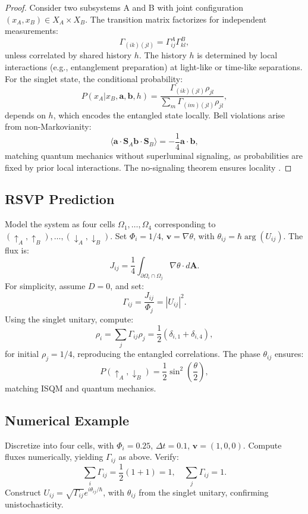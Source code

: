 \documentclass[12pt]{article}
\begin{document}
{\begin{proof}
Consider two subsystems A and B with joint configuration \((x_A, x_B) \in X_A \times X_B\). The transition matrix factorizes for independent measurements:
\[
\Gamma_{(i k)(j l)} = \Gamma_{ij}^A \Gamma_{kl}^B,
\]
unless correlated by shared history \(h\). The history \(h\) is determined by local interactions (e.g., entanglement preparation) at light-like or time-like separations. For the singlet state, the conditional probability:
\[
P(x_A | x_B, \mathbf{a}, \mathbf{b}, h) = \frac{\Gamma_{(i k)(j l)} \rho_{j l}}{\sum_m \Gamma_{(i m)(j l)} \rho_{j l}},
\]
depends on \(h\), which encodes the entangled state locally. Bell violations arise from non-Markovianity:
\[
\langle \mathbf{a} \cdot \mathbf{S}_A \mathbf{b} \cdot \mathbf{S}_B \rangle = -\frac{1}{4} \mathbf{a} \cdot \mathbf{b},
\]
matching quantum mechanics without superluminal signaling, as probabilities are fixed by prior local interactions. The no-signaling theorem ensures locality \cite{Barandes2023}.
\end{proof}

\subsection{RSVP Prediction}

Model the system as four cells \(\Omega_1, \ldots, \Omega_4\) corresponding to \((\uparrow_A, \uparrow_B), \ldots, (\downarrow_A, \downarrow_B)\). Set \(\Phi_i = 1/4\), \(\mathbf{v} = \nabla \theta\), with \(\theta_{ij} = \hbar \arg(U_{ij})\). The flux is:
\[
J_{ij} = \frac{1}{4} \int_{\partial \Omega_i \cap \Omega_j} \nabla \theta \cdot d\mathbf{A}.
\]
For simplicity, assume \(D = 0\), and set:
\[
\Gamma_{ij} = \frac{J_{ij}}{\Phi_j} = |U_{ij}|^2.
\]
Using the singlet unitary, compute:
\[
\rho_i = \sum_j \Gamma_{ij} \rho_j = \frac{1}{2} \left( \delta_{i,1} + \delta_{i,4} \right),
\]
for initial \(\rho_j = 1/4\), reproducing the entangled correlations. The phase \(\theta_{ij}\) ensures:
\[
P(\uparrow_A, \downarrow_B) = \frac{1}{2} \sin^2 \left( \frac{\theta}{2} \right),
\]
matching ISQM and quantum mechanics.

\subsection{Numerical Example}

Discretize into four cells, with \(\Phi_i = 0.25\), \(\Delta t = 0.1\), \(\mathbf{v} = (1, 0, 0)\). Compute fluxes numerically, yielding \(\Gamma_{ij}\) as above. Verify:
\[
\sum_i \Gamma_{ij} = \frac{1}{2} (1 + 1) = 1, \quad \sum_j \Gamma_{ij} = 1.
\]
Construct \(U_{ij} = \sqrt{\Gamma_{ij}} e^{i \theta_{ij} / \hbar}\), with \(\theta_{ij}\) from the singlet unitary, confirming unistochasticity.

}
\end{document}
